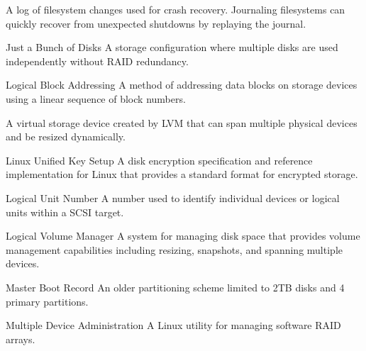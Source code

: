 \documentclass[letterpaper,10pt,english]{sphinxmanual}
\begin{document}
\begin{description}
\sphinxAtStartPar
A log of filesystem changes used for crash recovery. Journaling filesystems can quickly recover from unexpected shutdowns by replaying the journal.

\sphinxAtStartPar
Just a Bunch of Disks \sphinxhyphen{} A storage configuration where multiple disks are used independently without RAID redundancy.

\sphinxAtStartPar
Logical Block Addressing \sphinxhyphen{} A method of addressing data blocks on storage devices using a linear sequence of block numbers.

\sphinxAtStartPar
A virtual storage device created by LVM that can span multiple physical devices and be resized dynamically.

\sphinxAtStartPar
Linux Unified Key Setup \sphinxhyphen{} A disk encryption specification and reference implementation for Linux that provides a standard format for encrypted storage.

\sphinxAtStartPar
Logical Unit Number \sphinxhyphen{} A number used to identify individual devices or logical units within a SCSI target.

\sphinxAtStartPar
Logical Volume Manager \sphinxhyphen{} A system for managing disk space that provides volume management capabilities including resizing, snapshots, and spanning multiple devices.

\sphinxAtStartPar
Master Boot Record \sphinxhyphen{} An older partitioning scheme limited to 2TB disks and 4 primary partitions.

\sphinxAtStartPar
Multiple Device Administration \sphinxhyphen{} A Linux utility for managing software RAID arrays.


\end{description}
\end{document}

